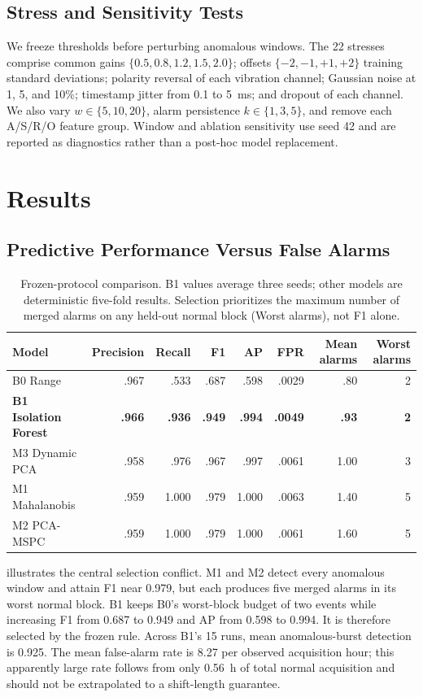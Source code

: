 \documentclass{article}
\begin{document}
\subsection{Stress and Sensitivity Tests}

We freeze thresholds before perturbing anomalous windows. The 22 stresses comprise common gains $\{0.5,0.8,1.2,1.5,2.0\}$; offsets $\{-2,-1,+1,+2\}$ training standard deviations; polarity reversal of each vibration channel; Gaussian noise at 1, 5, and 10\%; timestamp jitter from 0.1 to 5~ms; and dropout of each channel. We also vary $w\in\{5,10,20\}$, alarm persistence $k\in\{1,3,5\}$, and remove each A/S/R/O feature group. Window and ablation sensitivity use seed 42 and are reported as diagnostics rather than a post-hoc model replacement.

\section{Results}

\subsection{Predictive Performance Versus False Alarms}

\begin{table}[t]
\caption{Frozen-protocol comparison. B1 values average three seeds; other models are deterministic five-fold results. Selection prioritizes the maximum number of merged alarms on any held-out normal block (Worst alarms), not F1 alone.}
\label{tab:main}
\centering
\small
\begin{tabular}{lrrrrrrr}
\toprule
Model & Precision & Recall & F1 & AP & FPR & Mean alarms & Worst alarms \\
\midrule
B0 Range & .967 & .533 & .687 & .598 & .0029 & .80 & 2 \\
\textbf{B1 Isolation Forest} & \textbf{.966} & \textbf{.936} & \textbf{.949} & \textbf{.994} & \textbf{.0049} & \textbf{.93} & \textbf{2} \\
M3 Dynamic PCA & .958 & .976 & .967 & .997 & .0061 & 1.00 & 3 \\
M1 Mahalanobis & .959 & 1.000 & .979 & 1.000 & .0063 & 1.40 & 5 \\
M2 PCA-MSPC & .959 & 1.000 & .979 & 1.000 & .0061 & 1.60 & 5 \\
\bottomrule
\end{tabular}
\end{table}

 illustrates the central selection conflict. M1 and M2 detect every anomalous window and attain F1 near 0.979, but each produces five merged alarms in its worst normal block. B1 keeps B0's worst-block budget of two events while increasing F1 from 0.687 to 0.949 and AP from 0.598 to 0.994. It is therefore selected by the frozen rule. Across B1's 15 runs, mean anomalous-burst detection is 0.925. The mean false-alarm rate is 8.27 per observed acquisition hour; this apparently large rate follows from only 0.56~h of total normal acquisition and should not be extrapolated to a shift-length guarantee.
\end{document}

